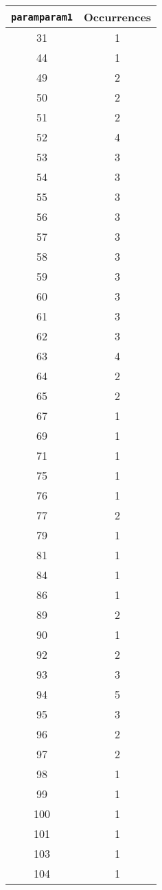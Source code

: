 \documentclass[letterpaper, 12pt]{article}
\begin{document}
\begin{longtable}{|c|c|}
\hline
\textbf{\texttt{paramparam1}} & \textbf{Occurrences} \\
\hline
31 & 1 \\
\hline
44 & 1 \\
\hline
49 & 2 \\
\hline
50 & 2 \\
\hline
51 & 2 \\
\hline
52 & 4 \\
\hline
53 & 3 \\
\hline
54 & 3 \\
\hline
55 & 3 \\
\hline
56 & 3 \\
\hline
57 & 3 \\
\hline
58 & 3 \\
\hline
59 & 3 \\
\hline
60 & 3 \\
\hline
61 & 3 \\
\hline
62 & 3 \\
\hline
63 & 4 \\
\hline
64 & 2 \\
\hline
65 & 2 \\
\hline
67 & 1 \\
\hline
69 & 1 \\
\hline
71 & 1 \\
\hline
75 & 1 \\
\hline
76 & 1 \\
\hline
77 & 2 \\
\hline
79 & 1 \\
\hline
81 & 1 \\
\hline
84 & 1 \\
\hline
86 & 1 \\
\hline
89 & 2 \\
\hline
90 & 1 \\
\hline
92 & 2 \\
\hline
93 & 3 \\
\hline
94 & 5 \\
\hline
95 & 3 \\
\hline
96 & 2 \\
\hline
97 & 2 \\
\hline
98 & 1 \\
\hline
99 & 1 \\
\hline
100 & 1 \\
\hline
101 & 1 \\
\hline
103 & 1 \\
\hline
104 & 1 \\

\end{longtable}
\end{document}
